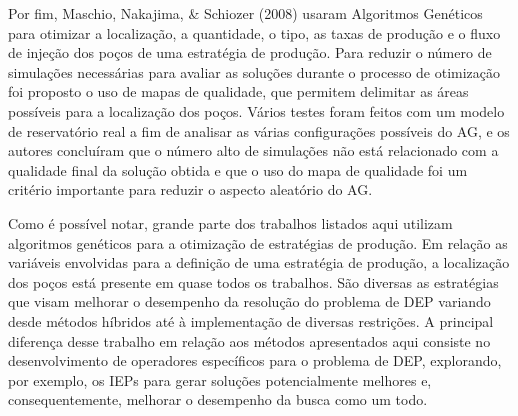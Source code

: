 Por fim, Maschio, Nakajima, \& Schiozer (2008) usaram Algoritmos Genéticos para otimizar a localização, a quantidade, o tipo, as taxas de produção e o fluxo de injeção dos poços de uma estratégia de produção. Para reduzir o número de simulações necessárias para avaliar as soluções durante o processo de otimização foi proposto o uso de mapas de qualidade, que permitem delimitar as áreas possíveis para a localização dos poços. Vários testes foram feitos com um modelo de reservatório real a fim de analisar as várias configurações possíveis do AG, e os autores concluíram que o número alto de simulações não está relacionado com a qualidade final da solução obtida e que o uso do mapa de qualidade foi um critério importante para reduzir o aspecto aleatório do AG.

Como é possível notar, grande parte dos trabalhos listados aqui utilizam algoritmos genéticos para a otimização de estratégias de produção. Em relação as variáveis envolvidas para a definição de uma estratégia de produção, a localização dos poços está presente em quase todos os trabalhos. São diversas as estratégias que visam melhorar o desempenho da resolução do problema de DEP variando desde métodos híbridos até à implementação de diversas restrições. A principal diferença desse trabalho em relação aos métodos apresentados aqui consiste no desenvolvimento de operadores específicos para o problema de DEP, explorando, por exemplo, os IEPs para gerar soluções potencialmente melhores e, consequentemente, melhorar o desempenho da busca como um todo.